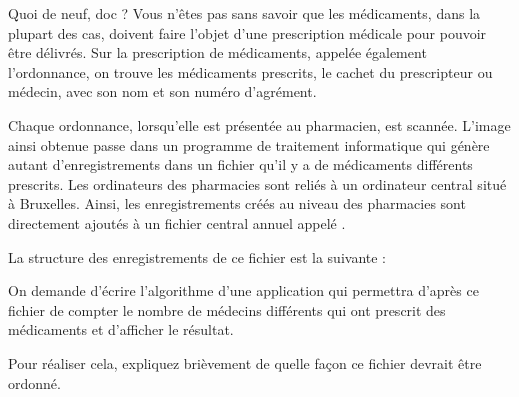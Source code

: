 \begin{Exercice}{Quoi de neuf, doc ?}
	Vous n’êtes pas sans savoir que les médicaments, dans la plupart des
	cas, doivent faire l’objet d’une prescription médicale pour pouvoir
	être délivrés. Sur la prescription de médicaments, appelée également
	l’ordonnance, on trouve les médicaments prescrits, le cachet du
	prescripteur ou médecin, avec son nom et son numéro d’agrément.

	Chaque ordonnance, lorsqu’elle est présentée au pharmacien, est scannée.
	L’image ainsi obtenue passe dans un programme de traitement
	informatique qui génère autant d’enregistrements dans un fichier qu’il
	y a de médicaments différents prescrits. Les ordinateurs des pharmacies
	sont reliés à un ordinateur central situé à Bruxelles. Ainsi, les
	enregistrements créés au niveau des pharmacies sont directement ajoutés
	à un fichier central annuel appelé . 

	La structure  des enregistrements de ce fichier est
	la suivante :


	On demande d’écrire l’algorithme d’une application qui permettra d’après
	ce fichier de compter le nombre de médecins différents qui ont prescrit
	des médicaments et d’afficher le résultat.

	Pour réaliser cela, expliquez brièvement de quelle façon ce fichier
	devrait être ordonné.
\end{Exercice}

